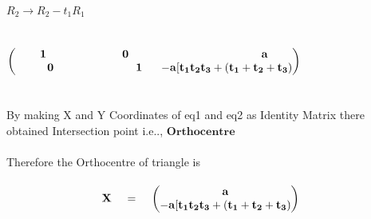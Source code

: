\documentclass[journal,12pt,twocolumn]{IEEEtran}
\newcommand{\myvec}[1]{\ensuremath{\begin{pmatrix}#1\end{pmatrix}}}
\let\vec\mathbf
\begin{document}
\\
\hspace*{.8cm}$R_2 \rightarrow {R_2-t_1R_1}$
\\
\\
\\
\myvec{\vec{{1 \hspace{2.4cm}{0 \hspace{4.2cm} {a }}}} \\ \vec{{\hspace{1cm} 0 \hspace{2.5cm}{\hspace{.1cm} 1 \hspace{.1cm} {\hspace{.5cm}-a[t_1t_2t_3 + (t_1+t_2+t_3) }}}}}
\\
\\
\\
By making X and Y Coordinates of eq1 and eq2 as Identity Matrix there obtained Intersection point i.e.., $\vec{Orthocentre}$
\\
\\
Therefore the Orthocentre of triangle is
\\
\\$\hspace{3cm}\vec{X}\hspace{.4cm} = \hspace{.4cm}\myvec{\vec{a}\\\vec{-a[t_1t_2t_3 + (t_1+t_2+t_3)}}$
\end{document}
